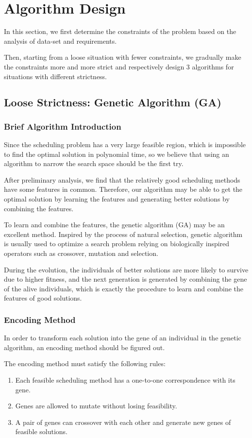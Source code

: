 \documentclass{llncs}
\begin{document}
\section{Algorithm Design}
In this section, we first determine the constraints of the problem based on the analysis of data-set and requirements. 

Then, starting from a loose situation with fewer constraints, we gradually make the constraints more and more strict and respectively design $3$ algorithms for situations with different strictness.
\subsection{Loose Strictness: Genetic Algorithm (GA)}
\subsubsection{Brief Algorithm Introduction}
Since the scheduling problem has a very large feasible region, which is impossible to find the optimal solution in polynomial time, so we believe that using an algorithm to narrow the search space should be the first try.

After preliminary analysis, we find that the relatively good scheduling methods have some features in common. Therefore, our algorithm may be able to get the optimal solution by learning the features and generating better solutions by combining the features.

To learn and combine the features, the genetic algorithm (GA) may be an excellent method. Inspired by the process of natural selection, genetic algorithm is usually used to optimize a search problem relying on biologically inspired operators such as crossover, mutation and selection. 

During the evolution, the individuals of better solutions are more likely to survive due to higher fitness, and the next generation is generated by combining the gene of the alive individuals, which is exactly the procedure to learn and combine the features of good solutions.
\subsubsection{Encoding Method}
In order to transform each solution into the gene of an individual in the genetic algorithm, an encoding method should be figured out. 

The encoding method must satisfy the following rules:
\begin{enumerate}
\item
Each feasible scheduling method has a one-to-one correspondence with its gene.
\item
Genes are allowed to mutate without losing feasibility.
\item
A pair of genes can crossover with each other and generate new genes of feasible solutions.
\end{enumerate}
\end{document}
